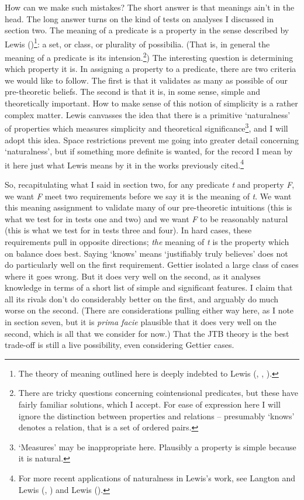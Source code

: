 \documentclass[
  11pt,
  letterpaper,
  DIV=11,
  numbers=noendperiod,
  twoside]{scrartcl}
\begin{document}
How can we make such mistakes? The short answer is that meanings ain't
in the head. The long answer turns on the kind of tests on analyses I
discussed in section two. The meaning of a predicate is a property in
the sense described by Lewis
()\footnote{The theory of meaning
  outlined here is deeply indebted to Lewis
  (, ,
  ).}: a set, or class, or plurality of
possibilia. (That is, in general the meaning of a predicate is its
intension.\footnote{There are tricky questions concerning cointensional
  predicates, but these have fairly familiar solutions, which I accept.
  For ease of expression here I will ignore the distinction between
  properties and relations -- presumably `knows' denotes a relation,
  that is a set of ordered pairs.}) The interesting question is
determining which property it is. In assigning a property to a
predicate, there are two criteria we would like to follow. The first is
that it validates as many as possible of our pre-theoretic beliefs. The
second is that it is, in some sense, simple and theoretically important.
How to make sense of this notion of simplicity is a rather complex
matter. Lewis canvasses the idea that there is a primitive `naturalness'
of properties which measures simplicity and theoretical
significance\footnote{`Measures' may be inappropriate here. Plausibly a
  property is simple because it is natural.}, and I will adopt this
idea. Space restrictions prevent me going into greater detail concerning
`naturalness', but if something more definite is wanted, for the record
I mean by it here just what Lewis means by it in the works previously
cited.\footnote{For more recent applications of naturalness in Lewis's
  work, see Langton and Lewis (,
  ) and Lewis
  ().}

So, recapitulating what I said in section two, for any predicate
\emph{t} and property \emph{F}, we want \emph{F} meet two requirements
before we say it is the meaning of \emph{t}. We want this meaning
assignment to validate many of our pre-theoretic intuitions (this is
what we test for in tests one and two) and we want \emph{F} to be
reasonably natural (this is what we test for in tests three and four).
In hard cases, these requirements pull in opposite directions;
\emph{the} meaning of \emph{t} is the property which on balance does
best. Saying `knows' means `justifiably truly believes' does not do
particularly well on the first requirement. Gettier isolated a large
class of cases where it goes wrong. But it does very well on the second,
as it analyses knowledge in terms of a short list of simple and
significant features. I claim that all its rivals don't do considerably
better on the first, and arguably do much worse on the second. (There
are considerations pulling either way here, as I note in section seven,
but it is \emph{prima facie} plausible that it does very well on the
second, which is all that we consider for now.) That the JTB theory is
the best trade-off is still a live possibility, even considering Gettier
cases.
\end{document}

